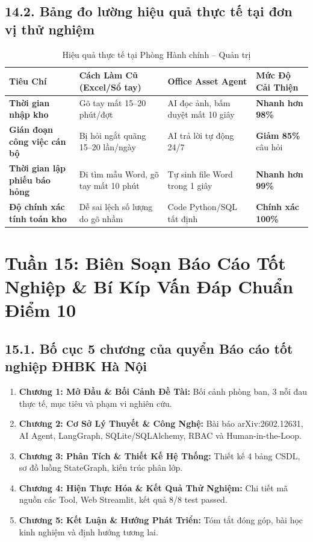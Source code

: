 \documentclass[11pt,a4paper]{article}
\begin{document}
\subsection{14.2. Bảng đo lường hiệu quả thực tế tại đơn vị thử nghiệm}
\begin{table}[H]
\centering
\small
\begin{tabularx}{\textwidth}{l X X X}
\toprule
\textbf{Tiêu Chí} & \textbf{Cách Làm Cũ (Excel/Sổ tay)} & \textbf{Office Asset Agent} & \textbf{Mức Độ Cải Thiện} \\
\midrule
\textbf{Thời gian nhập kho} & Gõ tay mất 15--20 phút/đợt & AI đọc ảnh, bấm duyệt mất 10 giây & \textbf{Nhanh hơn 98\%} \\
\textbf{Gián đoạn công việc cán bộ} & Bị hỏi ngắt quãng 15--20 lần/ngày & AI trả lời tự động 24/7 & \textbf{Giảm 85\%} câu hỏi \\
\textbf{Thời gian lập phiếu báo hỏng} & Đi tìm mẫu Word, gõ tay mất 10 phút & Tự sinh file Word trong 1 giây & \textbf{Nhanh hơn 99\%} \\
\textbf{Độ chính xác tính toán kho} & Dễ sai lệch số lượng do gõ nhầm & Code Python/SQL tất định & \textbf{Chính xác 100\%} \\
\bottomrule
\end{tabularx}
\caption{Hiệu quả thực tế tại Phòng Hành chính -- Quản trị}
\end{table}

\section{Tuần 15: Biên Soạn Báo Cáo Tốt Nghiệp \& Bí Kíp Vấn Đáp Chuẩn Điểm 10}

\subsection{15.1. Bố cục 5 chương của quyển Báo cáo tốt nghiệp ĐHBK Hà Nội}
\begin{enumerate}
    \item \textbf{Chương 1: Mở Đầu \& Bối Cảnh Đề Tài:} Bối cảnh phòng ban, 3 nỗi đau thực tế, mục tiêu và phạm vi nghiên cứu.
    \item \textbf{Chương 2: Cơ Sở Lý Thuyết \& Công Nghệ:} Bài báo arXiv:2602.12631, AI Agent, LangGraph, SQLite/SQLAlchemy, RBAC và Human-in-the-Loop.
    \item \textbf{Chương 3: Phân Tích \& Thiết Kế Hệ Thống:} Thiết kế 4 bảng CSDL, sơ đồ luồng StateGraph, kiến trúc phân lớp.
    \item \textbf{Chương 4: Hiện Thực Hóa \& Kết Quả Thử Nghiệm:} Chi tiết mã nguồn các Tool, Web Streamlit, kết quả 8/8 test passed.
    \item \textbf{Chương 5: Kết Luận \& Hướng Phát Triển:} Tóm tắt đóng góp, bài học kinh nghiệm và định hướng tương lai.
\end{enumerate}
\end{document}
